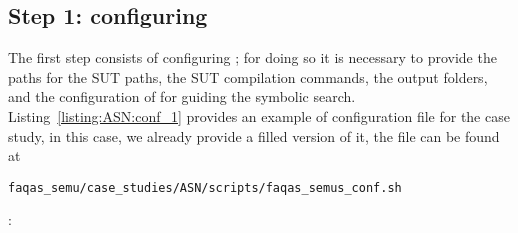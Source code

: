 \subsection{Step 1: configuring \SEMUS}

The first step consists of configuring \SEMUS; for doing so it is necessary to provide the paths for the SUT paths, the SUT compilation commands, the output folders, and the configuration of \SEMU for guiding the symbolic search. Listing~\ref{listing:ASN:conf_1} provides an example of configuration file for the case study, in this case, we already provide a filled version of it, the file can be found at \linebreak \begin{footnotesize}\texttt{faqas\_semu/case\_studies/ASN/scripts/faqas\_semus\_conf.sh}\end{footnotesize}:

